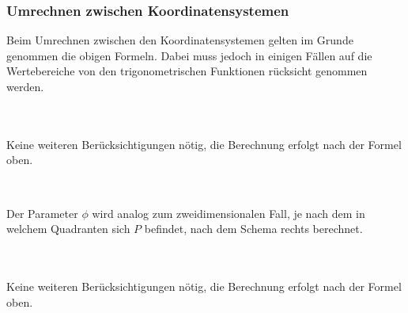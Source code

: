 \subsubsection{Umrechnen zwischen Koordinatensystemen}
Beim Umrechnen zwischen den Koordinatensystemen gelten im Grunde genommen die obigen Formeln. 
Dabei muss jedoch in einigen Fällen auf die Wertebereiche von den trigonometrischen Funktionen rücksicht genommen werden.

\\
\\
Keine weiteren Berücksichtigungen nötig, die Berechnung erfolgt nach der Formel oben.
\medskip

\\
\begin{minipage}{0.49\linewidth}
    Der Parameter $\phi$ wird analog zum zweidimensionalen Fall, je nach dem in welchem Quadranten sich $P$ befindet, nach dem Schema rechts berechnet.
\end{minipage}
\hfill
\begin{minipage}{0.49\linewidth}
    \begin{center}
    \end{center}
\end{minipage}
\medskip

\\
\\
Keine weiteren Berücksichtigungen nötig, die Berechnung erfolgt nach der Formel oben.
\medskip

